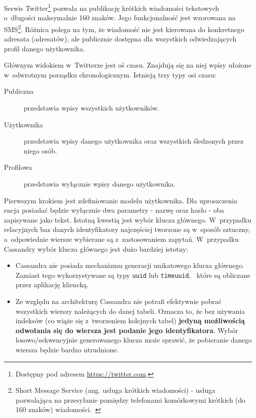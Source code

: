 Serwis Twitter\footnote{Dostępny pod adresem \url{https://twitter.com}.} pozwala na publikację krótkich wiadomości tekstowych o~długości maksymalnie 160 znaków. Jego funkcjonalność jest wzorowana na SMS\footnote{Short Message Service (ang. usługa krótkich wiadomości) - usługa pozwalająca na przesyłanie pomiędzy telefonami komórkowymi krótkich (do 160 znaków) wiadomości.~\cite{sms_definition}}. Różnica polega na tym, że wiadomość nie jest kierowana do konkretnego adresata (adresatów), ale publicznie dostępna dla wszystkich odwiedzających profil danego użytkownika.

Głównym widokiem w~Twitterze jest oś czasu. Znajdują się na niej wpisy ułożone w~odwrotnym porządku chronologicznym. Istnieją trzy typy osi czasu:

\begin{description}
	\item[Publiczna] przedstawia wpisy wszystkich użytkowników.
	\item[Użytkownika] przedstawia wpisy danego użytkownika oraz wszystkich śledzonych przez niego osób.
	\item[Profilowa] przedstawia wyłącznie wpisy danego użytkownika.
\end{description}

Pierwszym krokiem jest zdefiniowanie modelu użytkownika. Dla uproszczenia encja posiadać będzie wyłącznie dwa parametry - nazwę oraz hasło - oba zapisywane jako tekst. Istotną kwestią jest wybór klucza głównego. W~przypadku relacyjnych baz danych identyfikatory najczęściej tworzone są w~sposób sztuczny, a~odpowiednie wiersze wybierane są z~zastosowaniem zapytań. W~przypadku Cassandry wybór klucza głównego jest dużo bardziej istotny:

\begin{itemize}
	\item Cassandra nie posiada mechanizmu generacji unikatowego klucza głównego. Zamiast tego wykorzystywane są typy \verb+uuid+ lub \verb+timeuuid+,~\cite{uuid_timeuuid} które są obliczane przez aplikację kliencką. 
	\item Ze względu na architekturę Cassandra nie potrafi efektywnie pobrać wszystkich wierszy należących do danej tabeli. Oznacza to, że bez używania indeksów (co wiąże się z~tworzeniem kolejnych tabel) \textbf{jedyną możliwością odwołania się do wiersza jest podanie jego identyfikatora}. Wybór losowo/sekwencyjnie generowanego klucza może sprawić, że pobieranie danego wiersza będzie bardzo utrudnione.
\end{itemize}

